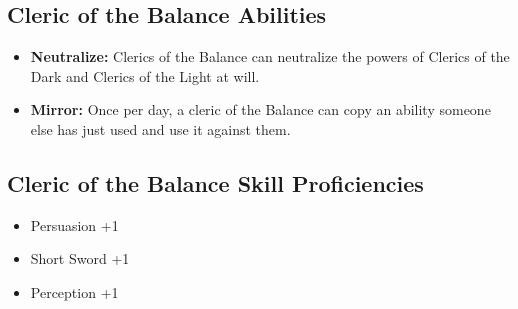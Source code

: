 \begin{multicols}{2}
\subsection{Cleric of the Balance Abilities}

\begin{itemize}
  \item \textbf{Neutralize:} Clerics of the Balance can neutralize the powers of
    Clerics of the Dark and Clerics of the Light at will.
  \item \textbf{Mirror:} Once per day, a cleric of the Balance can copy an ability
    someone else has just used and use it against them.
\end{itemize}

\subsection{Cleric of the Balance Skill Proficiencies}

\begin{itemize}
  \item Persuasion +1
  \item Short Sword +1
  \item Perception +1
\end{itemize}

\end{multicols}
